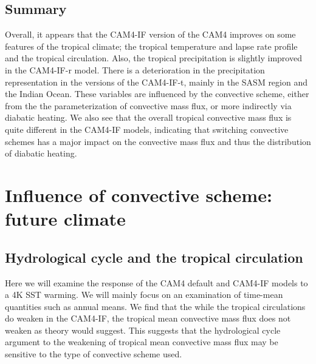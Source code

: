 \documentclass[letterpaper,12pt,titlepage,oneside,final]{book}
\begin{document}
\section{Summary}

Overall, it appears that the CAM4-IF version of the CAM4 improves on some features of the tropical climate; the tropical temperature and lapse rate profile and the tropical circulation. Also, the tropical precipitation is slightly improved in the CAM4-IF-r model. There is a deterioration in the precipitation representation in the versions of the CAM4-IF-t, mainly in the SASM region and the Indian Ocean. These variables are influenced by the convective scheme, either from the the parameterization of convective mass flux, or more indirectly via diabatic heating. We also see that the overall tropical convective mass flux is quite different in the CAM4-IF models, indicating that switching convective schemes has a major impact on the convective mass flux and thus the distribution of diabatic heating.


\chapter{Influence of convective scheme: future climate}

\section{Hydrological cycle and the tropical circulation}

Here we will examine the response of the CAM4 default and CAM4-IF models to a 4K SST warming. We will mainly focus on an examination of time-mean quantities such as annual means. We find that the while the tropical circulations do weaken in the CAM4-IF, the tropical mean convective mass flux does not weaken as theory would suggest. This suggests that the hydrological cycle argument to the weakening of tropical mean convective mass flux may be sensitive to the type of convective scheme used.
\end{document}
